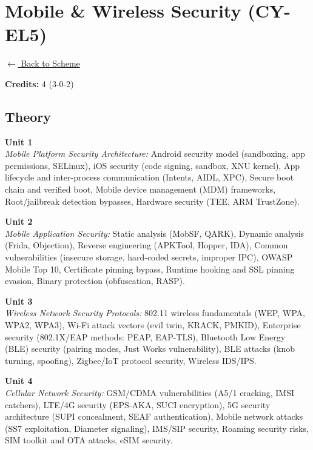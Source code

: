 \section*{Mobile \& Wireless Security (CY-EL5)}
\label{elec:CY_5}

\noindent \small{\hyperref[main:scheme]{$\leftarrow$ Back to Scheme}} \vspace{0.5cm}

\noindent \textbf{Credits:} 4 (3-0-2)

\subsection*{Theory}
\noindent\textbf{Unit 1} \\
\textit{Mobile Platform Security Architecture:} Android security model (sandboxing, app permissions, SELinux), iOS security (code signing, sandbox, XNU kernel), App lifecycle and inter-process communication (Intents, AIDL, XPC), Secure boot chain and verified boot, Mobile device management (MDM) frameworks, Root/jailbreak detection bypasses, Hardware security (TEE, ARM TrustZone).

\vspace{0.3cm}

\noindent\textbf{Unit 2} \\
\textit{Mobile Application Security:} Static analysis (MobSF, QARK), Dynamic analysis (Frida, Objection), Reverse engineering (APKTool, Hopper, IDA), Common vulnerabilities (insecure storage, hard-coded secrets, improper IPC), OWASP Mobile Top 10, Certificate pinning bypass, Runtime hooking and SSL pinning evasion, Binary protection (obfuscation, RASP).

\vspace{0.3cm}

\noindent\textbf{Unit 3} \\
\textit{Wireless Network Security Protocols:} 802.11 wireless fundamentals (WEP, WPA, WPA2, WPA3), Wi-Fi attack vectors (evil twin, KRACK, PMKID), Enterprise security (802.1X/EAP methods: PEAP, EAP-TLS), Bluetooth Low Energy (BLE) security (pairing modes, Just Works vulnerability), BLE attacks (knob turning, spoofing), Zigbee/IoT protocol security, Wireless IDS/IPS.

\vspace{0.3cm}

\noindent\textbf{Unit 4} \\
\textit{Cellular Network Security:} GSM/CDMA vulnerabilities (A5/1 cracking, IMSI catchers), LTE/4G security (EPS-AKA, SUCI encryption), 5G security architecture (SUPI concealment, SEAF authentication), Mobile network attacks (SS7 exploitation, Diameter signaling), IMS/SIP security, Roaming security risks, SIM toolkit and OTA attacks, eSIM security.

